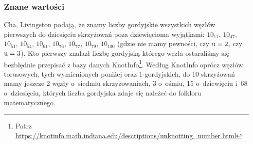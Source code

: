 
\subsubsection{Znane wartości}
Cha, Livingston \cite{cha2018} podają, że znamy liczby gordyjskie wszystkich węzłów pierwszych do dziesięciu skrzyżowań poza dziewięcioma wyjątkami: $10_{11}$, $10_{47}$, $10_{51}$, $10_{54}$, $10_{61}$, $10_{76}$, $10_{77}$, $10_{79}$, $10_{100}$ (gdzie nie mamy pewności, czy $\operatorname{u} = 2$, czy $\operatorname{u} = 3$).
%
%
Kto pierwszy znalazł liczbę gordyjską którego węzła ostaraliśmy się bezbłędnie przepisać z bazy danych KnotInfo\footnote{Patrz \url{https://knotinfo.math.indiana.edu/descriptions/unknotting_number.html}}.
Według KnotInfo oprócz węzłów torusowych, tych wymienionych poniżej oraz 1-gordyjskich, do 10 skrzyżowań mamy jeszcze 2 węzły o~siedmiu skrzyżowaniach, 3 o~ośmiu, 15 o~dziewięciu i~68 o~dziesięciu, których liczba gordyjska zdaje się należeć do folkloru matematycznego.

